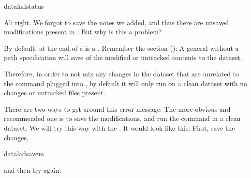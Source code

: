 \begin{sphinxVerbatim}[commandchars=\\\{\}]
dataladstatus
\end{sphinxVerbatim}

\sphinxAtStartPar
Ah right. We forgot to save the notes we added, and thus there are
unsaved modifications present in .
But why is this a problem?

\sphinxAtStartPar
By default, at the end of a  is a .
Remember the section {\hyperref[\detokenize{basics/101-102-populate:populate}]{}} (): A general  without
a path specification will save  of the modified or untracked
contents to the dataset.

\sphinxAtStartPar
Therefore, in order to not mix any changes in the dataset that are unrelated
to the command plugged into , by default it will only run
on a clean dataset with no changes or untracked files present.

\sphinxAtStartPar
There are two ways to get around this error message:
The more obvious \textendash{} and recommended \textendash{} one is to save the modifications,
and run the command in a clean dataset.
We will try this way with the .
It would look like this:
First, save the changes,

\begin{sphinxVerbatim}[commandchars=\\\{\}]
dataladsave\PYGZhy{}m
\end{sphinxVerbatim}

\sphinxAtStartPar
and then try again:

